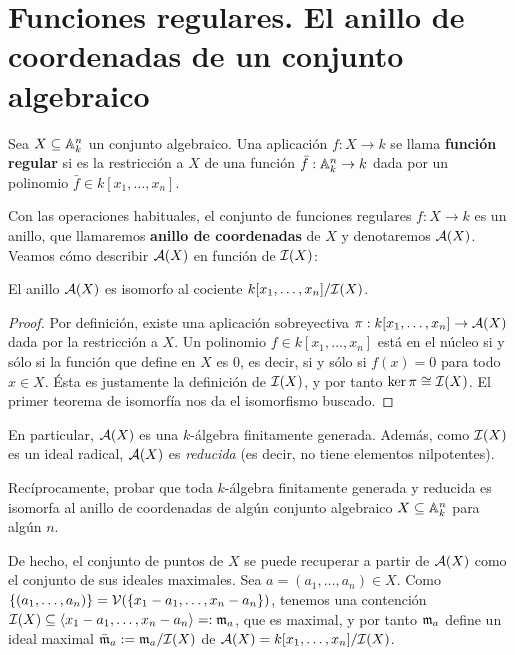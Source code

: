 \documentclass[ACGA.tex]{subfiles}
\begin{document}
\section[Funciones regulares]{Funciones regulares. El anillo de coordenadas de un conjunto algebraico}

\begin{defi}
 Sea $X\subseteq \mathbb{A}^n_k$ un conjunto algebraico. Una aplicación $f:X\to k$ se llama {\bf función regular} si es la restricción a $X$ de una función $\bar f:\mathbb{A}^n_k\to k$ dada por un polinomio $\bar f \in k[x_1,\ldots,x_n]$.
\end{defi}

Con las operaciones habituales, el conjunto de funciones regulares $f:X\to k$ es un anillo, que llamaremos {\bf anillo de coordenadas} de $X$ y denotaremos $\mathcal{A}(X)$. Veamos cómo describir $\mathcal{A}(X)$ en función de $\mathcal{I}(X)$:

\begin{prop}
 El anillo $\mathcal{A}(X)$ es isomorfo al cociente $k[x_1,\ldots,x_n]/\mathcal{I}(X)$.
\end{prop}

\begin{proof}
 Por definición, existe una aplicación sobreyectiva $\pi:k[x_1,\ldots,x_n]\to\mathcal{A}(X)$ dada por la restricción a $X$. Un polinomio $f\in k[x_1,\ldots,x_n]$ está en el núcleo si y sólo si la función que define en $X$ es $0$, es decir, si y sólo si $f(x)=0$ para todo $x\in X$. Ésta es justamente la definición de $\mathcal{I}(X)$, y por tanto $\ker\pi\cong\mathcal{I}(X)$. El primer teorema de isomorfía nos da el isomorfismo buscado.
\end{proof}

En particular, $\mathcal{A}(X)$ es una $k$-álgebra finitamente generada. Además, como $\mathcal{I}(X)$ es un ideal radical, $\mathcal{A}(X)$ es \emph{reducida} (es decir, no tiene elementos nilpotentes).

\begin{ejer}\label{full}
 Recíprocamente, probar que toda $k$-álgebra finitamente generada y reducida es isomorfa al anillo de coordenadas de algún conjunto algebraico $X\subseteq \mathbb{A}^n_k$ para algún $n$.
\end{ejer}

De hecho, el conjunto de puntos de $X$ se puede recuperar a partir de $\mathcal{A}(X)$ como el conjunto de sus ideales maximales. Sea $a=(a_1,\ldots,a_n)\in X$. Como $\{(a_1,\ldots,a_n)\}=\mathcal{V}(\{x_1-a_1,\ldots,x_n-a_n\})$, tenemos una contención $\mathcal{I}(X)\subseteq \langle x_1-a_1,\ldots,x_n-a_n\rangle =:{\mathfrak{m}}_a$, que es maximal, y por tanto ${\mathfrak{m}}_a$ define un ideal maximal $\bar{{\mathfrak{m}}}_a:={\mathfrak{m}}_a/\mathcal{I}(X)$ de $\mathcal{A}(X)=k[x_1,\ldots,x_n]/\mathcal{I}(X)$.
\end{document}
